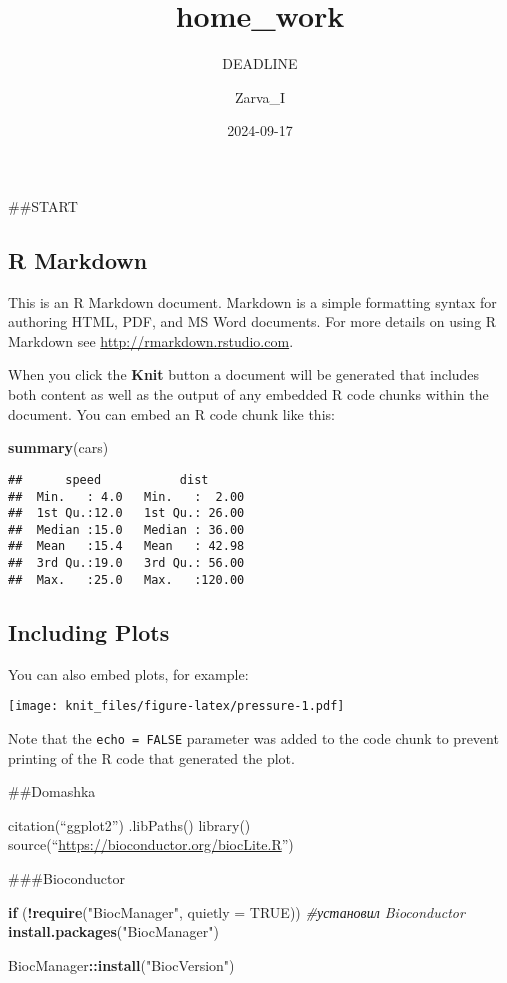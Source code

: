 \documentclass[
]{article}
\title{home\_work}
\subtitle{DEAD\textbar LINE}
\author{Zarva\_I}
\date{2024-09-17}
\newenvironment{Shaded}{\begin{snugshade}}{\end{snugshade}}
\newcommand{\AttributeTok}[1]{\textcolor[rgb]{0.13,0.29,0.53}{#1}}
\newcommand{\CommentTok}[1]{\textcolor[rgb]{0.56,0.35,0.01}{\textit{#1}}}
\newcommand{\ConstantTok}[1]{\textcolor[rgb]{0.56,0.35,0.01}{#1}}
\newcommand{\ControlFlowTok}[1]{\textcolor[rgb]{0.13,0.29,0.53}{\textbf{#1}}}
\newcommand{\FunctionTok}[1]{\textcolor[rgb]{0.13,0.29,0.53}{\textbf{#1}}}
\newcommand{\NormalTok}[1]{#1}
\newcommand{\SpecialCharTok}[1]{\textcolor[rgb]{0.81,0.36,0.00}{\textbf{#1}}}
\newcommand{\StringTok}[1]{\textcolor[rgb]{0.31,0.60,0.02}{#1}}
\begin{document}
\maketitle

\#\#START

\subsection{R Markdown}\label{r-markdown}

This is an R Markdown document. Markdown is a simple formatting syntax
for authoring HTML, PDF, and MS Word documents. For more details on
using R Markdown see \url{http://rmarkdown.rstudio.com}.

When you click the \textbf{Knit} button a document will be generated
that includes both content as well as the output of any embedded R code
chunks within the document. You can embed an R code chunk like this:

\begin{Shaded}
\begin{Highlighting}[]
\FunctionTok{summary}\NormalTok{(cars)}
\end{Highlighting}
\end{Shaded}

\begin{verbatim}
##      speed           dist       
##  Min.   : 4.0   Min.   :  2.00  
##  1st Qu.:12.0   1st Qu.: 26.00  
##  Median :15.0   Median : 36.00  
##  Mean   :15.4   Mean   : 42.98  
##  3rd Qu.:19.0   3rd Qu.: 56.00  
##  Max.   :25.0   Max.   :120.00
\end{verbatim}

\subsection{Including Plots}\label{including-plots}

You can also embed plots, for example:

\texttt{[image: knit\_files/figure-latex/pressure-1.pdf]}

Note that the \texttt{echo\ =\ FALSE} parameter was added to the code
chunk to prevent printing of the R code that generated the plot.

\#\#Domashka

citation(``ggplot2'') .libPaths() library()
source(``\url{https://bioconductor.org/biocLite.R}'')

\#\#\#Bioconductor

\begin{Shaded}
\begin{Highlighting}[]
\ControlFlowTok{if}\NormalTok{ (}\SpecialCharTok{!}\FunctionTok{require}\NormalTok{(}\StringTok{"BiocManager"}\NormalTok{, }\AttributeTok{quietly =} \ConstantTok{TRUE}\NormalTok{))  }\CommentTok{\#установил Bioconductor}
  \FunctionTok{install.packages}\NormalTok{(}\StringTok{"BiocManager"}\NormalTok{)}

\NormalTok{BiocManager}\SpecialCharTok{::}\FunctionTok{install}\NormalTok{(}\StringTok{"BiocVersion"}\NormalTok{)}
\end{Highlighting}
\end{Shaded}
\end{document}
